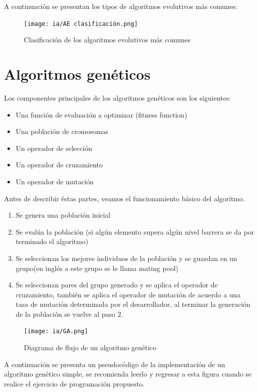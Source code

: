 \documentclass[11pt,fleqn]{book} %
\begin{document}
A continuación se presentan los tipos de algoritmos evolutivos más comunes:

\begin{figure}[ht]
\centering\texttt{[image: ia/AE clasificación.png]}
\caption{Clasificación de los algoritmos evolutivos más comunes}
\label{fig:classification-ae} 
\end{figure}

\section{Algoritmos genéticos}  \label{section:Algoritmos-geneticos}

Los componentes principales de los algoritmos genéticos son los siguientes:
\begin{itemize}
\item Una función de evaluación a optimizar (fitness function)
\item Una población de cromosomas
\item Un operador de selección
\item Un operador de cruzamiento
\item Un operador de mutación
\end{itemize}

Antes de describir éstas partes, veamos el funcionamiento básico del algoritmo.
\begin{enumerate}
\item Se genera una población inicial
\item Se evalúa la población (si algún elemento supera algún nivel barrera se da por terminado el algoritmo)
\item Se seleccionan los mejores individuos de la población y se guardan en un grupo(en inglés a este grupo se le llama mating pool)
\item Se seleccionan pares del grupo generado y se aplica el operador de cruzamiento, también se aplica el operador de mutación de acuerdo a una tasa de mutación determinada por el desarrollador, al terminar la generación de la población se vuelve al paso 2.
\end{enumerate}

\begin{figure}[ht]
\centering\texttt{[image: ia/GA.png]}
\caption{Diagrama de flujo de un algoritmo genético}
\label{fig:df-ga} 
\end{figure}

A continuación se presenta un pseudocódigo de la implementación de un algoritmo genético simple, se recomienda leerlo y regresar a esta figura cuando se realice el ejercicio de programación propuesto.
\end{document}
